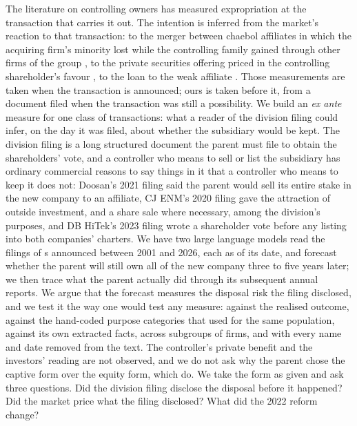 The literature on controlling owners has measured expropriation at the transaction that carries it out. The intention is inferred from the market's reaction to that transaction: to the merger between chaebol affiliates in which the acquiring firm's minority lost while the controlling family gained through other firms of the group \cite{bae2002}, to the private securities offering priced in the controlling shareholder's favour \cite{baek2006}, to the loan to the weak affiliate \cite{jiang2010, johnson2000, bertrand2002}. Those measurements are taken when the transaction is announced; ours is taken before it, from a document filed when the transaction was still a possibility. We build an \emph{ex ante} measure for one class of transactions: what a reader of the division filing could infer, on the day it was filed, about whether the subsidiary would be kept. The division filing is a long structured document the parent must file to obtain the shareholders' vote, and a controller who means to sell or list the subsidiary has ordinary commercial reasons to say things in it that a controller who means to keep it does not: Doosan's 2021 filing said the parent would sell its entire stake in the new company to an affiliate, CJ ENM's 2020 filing gave the attraction of outside investment, and a share sale where necessary, among the division's purposes, and DB HiTek's 2023 filing wrote a shareholder vote before any listing into both companies' charters. We have two large language models read the filings of \NScored{} \captive{}s announced between 2001 and 2026, each as of its date, and forecast whether the parent will still own all of the new company three to five years later; we then trace what the parent actually did through its subsequent annual reports. We argue that the forecast measures the disposal risk the filing disclosed, and we test it the way one would test any measure: against the realised outcome, against the hand-coded purpose categories that  used for the same population, against its own extracted facts, across subgroups of firms, and with every name and date removed from the text. The controller's private benefit and the investors' reading are not observed, and we do not ask why the parent chose the captive form over the equity form, which  do. We take the form as given and ask three questions. Did the division filing disclose the disposal before it happened? Did the market price what the filing disclosed? What did the 2022 reform change?


